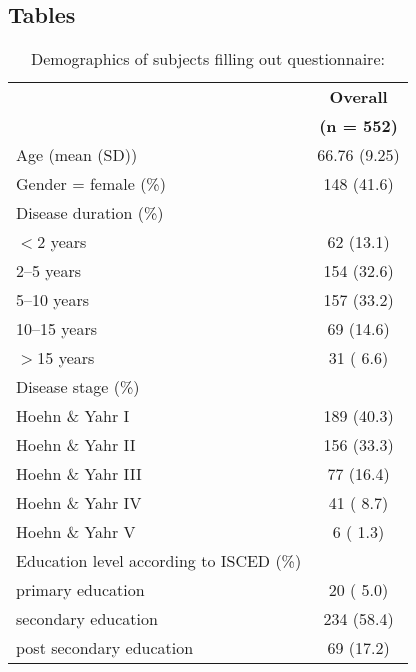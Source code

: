 \documentclass{bmcart}
\begin{document}
\begin{backmatter}
\section*{Tables}
\begin{table}[H]
\caption{Demographics of subjects filling out questionnaire:}
\label{tab1:demographics}
\begin{tabular}{p{5cm} c}
\toprule
&\textbf{Overall}\\ %
& \textbf{(n = 552)}\\ 
\midrule
Age (mean (SD)) & 66.76 (9.25) \\ \hline
Gender = female (\%) &  148 (41.6)  \\ \hline
Disease duration (\%) & \\ \hline
\hspace{3mm} $<$2 years & 62 (13.1) \\ \hline
\hspace{3mm} 2--5 years & 154 (32.6) \\ \hline
\hspace{3mm} 5--10 years & 157 (33.2) \\ \hline
\hspace{3mm} 10--15 years & 69 (14.6) \\ \hline
\hspace{3mm} $>$15 years& 31 ( 6.6) \\ \hline
Disease stage (\%)& \\ \hline
\hspace{3mm} Hoehn \& Yahr I &  189 (40.3) \\ \hline
\hspace{3mm} Hoehn \& Yahr II & 156 (33.3)  \\ \hline
\hspace{3mm} Hoehn \& Yahr III  &   77 (16.4) \\ \hline
\hspace{3mm} Hoehn \& Yahr IV  & 41 ( 8.7) \\ \hline
\hspace{3mm} Hoehn \& Yahr V  &     6 ( 1.3) \\ \hline
Education level according \newline to ISCED (\%) & \\ \hline
\hspace{3mm} primary education  & 20 ( 5.0) \\ \hline
\hspace{3mm} secondary education  & 234 (58.4)\\ \hline
\hspace{3mm} post secondary education  &   69 (17.2) \\ \hline

\end{tabular}
\end{table}
\end{backmatter}
\end{document}
